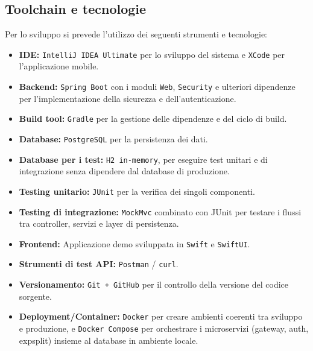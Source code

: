 \subsection{Toolchain e tecnologie}
Per lo sviluppo si prevede l'utilizzo dei seguenti strumenti e tecnologie:
\begin{itemize}
    \item \textbf{IDE:} \texttt{IntelliJ IDEA Ultimate} per lo sviluppo del sistema e \texttt{XCode} per l'applicazione mobile.
    \item \textbf{Backend:} \texttt{Spring Boot} con i moduli \texttt{Web}, \texttt{Security} e ulteriori dipendenze per l'implementazione della sicurezza e dell'autenticazione.
    \item \textbf{Build tool:} \texttt{Gradle} per la gestione delle dipendenze e del ciclo di build.
    \item \textbf{Database:} \texttt{PostgreSQL} per la persistenza dei dati.
    \item \textbf{Database per i test:} \texttt{H2 in-memory}, per eseguire test unitari e di integrazione senza dipendere dal database di produzione.
    \item \textbf{Testing unitario:} \texttt{JUnit} per la verifica dei singoli componenti.
    \item \textbf{Testing di integrazione:} \texttt{MockMvc} combinato con JUnit per testare i flussi tra controller, servizi e layer di persistenza.
    \item \textbf{Frontend:} Applicazione demo sviluppata in \texttt{Swift} e \texttt{SwiftUI}.
    \item \textbf{Strumenti di test API:} \texttt{Postman} / \texttt{curl}.
    \item \textbf{Versionamento:} \texttt{Git + GitHub} per il controllo della versione del codice sorgente.
    \item \textbf{Deployment/Container:} \texttt{Docker} per creare ambienti coerenti tra sviluppo e produzione, e \texttt{Docker Compose} per orchestrare i microservizi (gateway, auth, expsplit) insieme al database in ambiente locale.
\end{itemize}